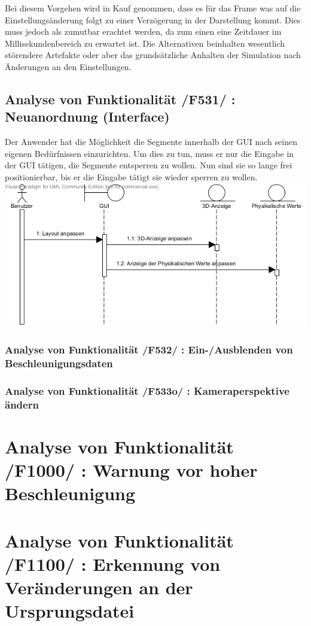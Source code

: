 Bei diesem Vorgehen wird in Kauf genommen, dass es für das Frame was auf die Einstellungsänderung folgt zu einer Verzögerung in der Darstellung kommt. Dies muss jedoch als zumutbar erachtet werden, da zum einen
eine Zeitdauer im Millisekundenbereich zu erwartet ist. Die Alternativen beinhalten wesentlich störendere Artefakte oder aber das grundsätzliche Anhalten der Simulation nach Änderungen an den Einstellungen.

\subsection{Analyse von Funktionalität /F531/ :   Neuanordnung (Interface)}
Der Anwender hat die Möglichkeit die Segmente innerhalb der GUI nach seinen eigenen Bedürfnissen einzurichten. Um dies zu tun, muss er nur die Eingabe in der GUI tätigen, die Segmente entsperren zu wollen.
Nun sind sie so lange frei positionierbar, bis er die Eingabe tätigt sie wieder sperren zu wollen.
\includegraphics[width=16cm]{bilder/Interface_Neuanordnung}
\subsubsection{Analyse von Funktionalität /F532/ :  Ein-/Ausblenden von Beschleunigungsdaten}
\subsubsection{Analyse von Funktionalität /F533o/ :  Kameraperspektive ändern}
\section{Analyse von Funktionalität /F1000/ :  Warnung vor hoher Beschleunigung}
\section{Analyse von Funktionalität /F1100/ :  Erkennung von Veränderungen an der Ursprungsdatei}